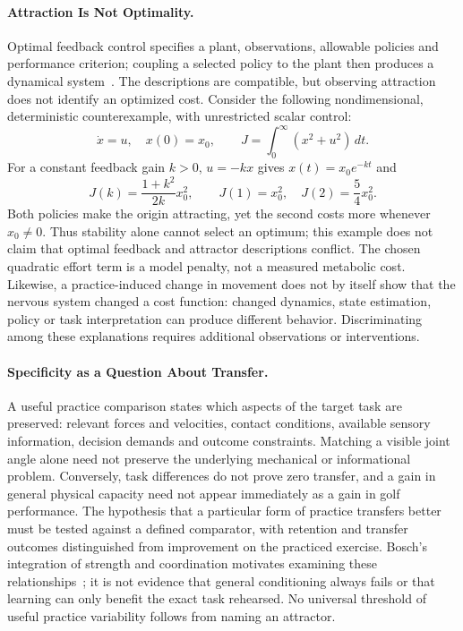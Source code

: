 
\paragraph{Attraction Is Not Optimality.}
Optimal feedback control specifies a plant, observations, allowable policies and performance criterion; coupling a selected policy to the plant then produces a dynamical system~\cite{Todorov2002}.
The descriptions are compatible, but observing attraction does not identify an optimized cost.
Consider the following nondimensional, deterministic counterexample, with unrestricted scalar control:
\begin{equation}
 \dot x=u,\quad x(0)=x_0,\qquad
 J=\int_0^\infty (x^2+u^2)\,dt.
\end{equation}
For a constant feedback gain $k>0$, $u=-kx$ gives $x(t)=x_0e^{-kt}$ and
\begin{equation}
 J(k)=\frac{1+k^2}{2k}x_0^2,\qquad
 J(1)=x_0^2,\quad J(2)=\frac54x_0^2.
\end{equation}
Both policies make the origin attracting, yet the second costs more whenever $x_0\ne0$.
Thus stability alone cannot select an optimum; this example does not claim that optimal feedback and attractor descriptions conflict.
The chosen quadratic effort term is a model penalty, not a measured metabolic cost.
Likewise, a practice-induced change in movement does not by itself show that the nervous system changed a cost function: changed dynamics, state estimation, policy or task interpretation can produce different behavior.
Discriminating among these explanations requires additional observations or interventions.


\paragraph{Specificity as a Question About Transfer.}
A useful practice comparison states which aspects of the target task are preserved: relevant forces and velocities, contact conditions, available sensory information, decision demands and outcome constraints.
Matching a visible joint angle alone need not preserve the underlying mechanical or informational problem.
Conversely, task differences do not prove zero transfer, and a gain in general physical capacity need not appear immediately as a gain in golf performance.
The hypothesis that a particular form of practice transfers better must be tested against a defined comparator, with retention and transfer outcomes distinguished from improvement on the practiced exercise.
Bosch's integration of strength and coordination motivates examining these relationships~\cite{Bosch2015}; it is not evidence that general conditioning always fails or that learning can only benefit the exact task rehearsed.
No universal threshold of useful practice variability follows from naming an attractor.

